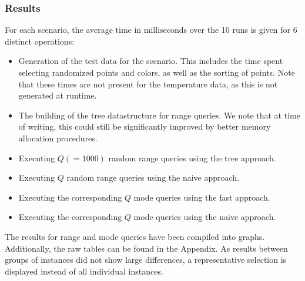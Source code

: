 \documentclass{article}
\begin{document}
\subsubsection*{Results}
For each scenario, the average time in milliseconds over the 10 runs is given for 6 distinct operations:
\begin{itemize}
    \item Generation of the test data for the scenario. This includes the time spent
          selecting randomized points and colors, as well as the sorting of points. Note
          that these times are not present for the temperature data, as this is not
          generated at runtime.
    \item The building of the tree datastructure for range queries. We note that at time
          of writing, this could still be significantly improved by better memory
          allocation procedures.
    \item Executing $Q (= 1000)$ random range queries using the tree approach.
    \item Executing $Q$ random range queries using the naive approach.
    \item Executing the corresponding $Q$ mode queries using the fast approach.
    \item Executing the corresponding $Q$ mode queries using the naive approach.
\end{itemize}
The results for range and mode queries have been compiled into graphs. Additionally, the raw tables can be found in the Appendix. As results between groups of instances did not show large differences, a representative selection is displayed instead of all individual instances. \\


\end{document}
